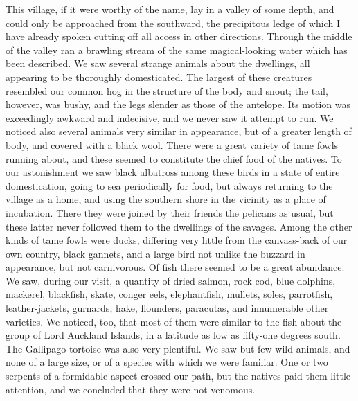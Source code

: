 This village, if it were worthy of the name, lay in a valley of some depth,
and could only be approached from the southward, the precipitous ledge of which
I have already spoken cutting off all access in other directions. Through the
middle of the valley ran a brawling stream of the same magical-looking water
which has been described. We saw several strange animals about the dwellings,
all appearing to be thoroughly domesticated. The largest of these creatures
resembled our common hog in the structure of the body and snout; the tail,
however, was bushy, and the legs slender as those of the antelope. Its motion
was exceedingly awkward and indecisive, and we never saw it attempt to run. We
noticed also several animals very similar in appearance, but of a greater length
of body, and covered with a black wool. There were a great variety of tame fowls
running about, and these seemed to constitute the chief food of the natives. To
our astonishment we saw black albatross among these birds in a state of entire
domestication, going to sea periodically for food, but always returning to the
village as a home, and using the southern shore in the vicinity as a place of
incubation. There they were joined by their friends the pelicans as usual, but
these latter never followed them to the dwellings of the savages. Among the
other kinds of tame fowls were ducks, differing very little from the
canvass-back of our own country, black gannets, and a large bird not unlike the
buzzard in appearance, but not carnivorous. Of fish there seemed to be a great
abundance. We saw, during our visit, a quantity of dried salmon, rock cod, blue
dolphins, mackerel, blackfish, skate, conger eels, elephantfish, mullets, soles,
parrotfish, leather-jackets, gurnards, hake, flounders, paracutas, and
innumerable other varieties. We noticed, too, that most of them were similar to
the fish about the group of Lord Auckland Islands, in a latitude as low as
fifty-one degrees south. The Gallipago tortoise was also very plentiful. We saw
but few wild animals, and none of a large size, or of a species with which we
were familiar. One or two serpents of a formidable aspect crossed our path, but
the natives paid them little attention, and we concluded that they were not
venomous. 

